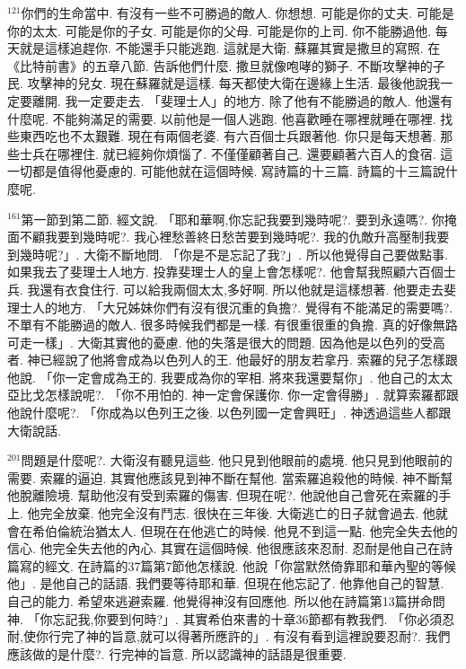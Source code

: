 \documentclass{book}
\begin{document}
$^{121}$你們的生命當中.
有沒有一些不可勝過的敵人.
你想想.
可能是你的丈夫.
可能是你的太太.
可能是你的子女.
可能是你的父母.
可能是你的上司.
你不能勝過他.
每天就是這樣追趕你.
不能還手只能逃跑.
這就是大衛.
蘇羅其實是撒旦的寫照.
在《比特前書》的五章八節.
告訴他們什麼.
撒旦就像咆哮的獅子.
不斷攻擊神的子民.
攻擊神的兒女.
現在蘇羅就是這樣.
每天都使大衛在邊緣上生活.
最後他說我一定要離開.
我一定要走去.
「斐理士人」的地方.
除了他有不能勝過的敵人.
他還有什麼呢.
不能夠滿足的需要.
以前他是一個人逃跑.
他喜歡睡在哪裡就睡在哪裡.
找些東西吃也不太艱難.
現在有兩個老婆.
有六百個士兵跟著他.
你只是每天想著.
那些士兵在哪裡住.
就已經夠你煩惱了.
不僅僅顧著自己.
還要顧著六百人的食宿.
這一切都是值得他憂慮的.
可能他就在這個時候.
寫詩篇的十三篇.
詩篇的十三篇說什麼呢.

$^{161}$第一節到第二節.
經文說.
「耶和華啊,你忘記我要到幾時呢?.
要到永遠嗎?.
你掩面不顧我要到幾時呢?.
我心裡愁善終日愁苦要到幾時呢?.
我的仇敵升高壓制我要到幾時呢?」.
大衛不斷地問.
「你是不是忘記了我?」.
所以他覺得自己要做點事.
如果我去了斐理士人地方.
投靠斐理士人的皇上會怎樣呢?.
他會幫我照顧六百個士兵.
我還有衣食住行.
可以給我兩個太太,多好啊.
所以他就是這樣想著.
他要走去斐理士人的地方.
「大兄姊妹你們有沒有很沉重的負擔?.
覺得有不能滿足的需要嗎?.
不單有不能勝過的敵人.
很多時候我們都是一樣.
有很重很重的負擔.
真的好像無路可走一樣」.
大衛其實他的憂慮.
他的失落是很大的問題.
因為他是以色列的受高者.
神已經說了他將會成為以色列人的王.
他最好的朋友若拿丹.
索羅的兒子怎樣跟他說.
「你一定會成為王的.
我要成為你的宰相.
將來我還要幫你」.
他自己的太太亞比戈怎樣說呢?.
「你不用怕的.
神一定會保護你.
你一定會得勝」.
就算索羅都跟他說什麼呢?.
「你成為以色列王之後.
以色列國一定會興旺」.
神透過這些人都跟大衛說話.

$^{201}$問題是什麼呢?.
大衛沒有聽見這些.
他只見到他眼前的處境.
他只見到他眼前的需要.
索羅的逼迫.
其實他應該見到神不斷在幫他.
當索羅追殺他的時候.
神不斷幫他脫離險境.
幫助他沒有受到索羅的傷害.
但現在呢?.
他說他自己會死在索羅的手上.
他完全放棄.
他完全沒有鬥志.
很快在三年後.
大衛逃亡的日子就會過去.
他就會在希伯倫統治猶太人.
但現在在他逃亡的時候.
他見不到這一點.
他完全失去他的信心.
他完全失去他的內心.
其實在這個時候.
他很應該來忍耐.
忍耐是他自己在詩篇寫的經文.
在詩篇的37篇第7節他怎樣說.
他說「你當默然倚靠耶和華內聖的等候他」.
是他自己的話語.
我們要等待耶和華.
但現在他忘記了.
他靠他自己的智慧.
自己的能力.
希望來逃避索羅.
他覺得神沒有回應他.
所以他在詩篇第13篇拼命問神.
「你忘記我,你要到何時?」.
其實希伯來書的十章36節都有教我們.
「你必須忍耐,使你行完了神的旨意,就可以得著所應許的」.
有沒有看到這裡說要忍耐?.
我們應該做的是什麼?.
行完神的旨意.
所以認識神的話語是很重要.
\end{document}
